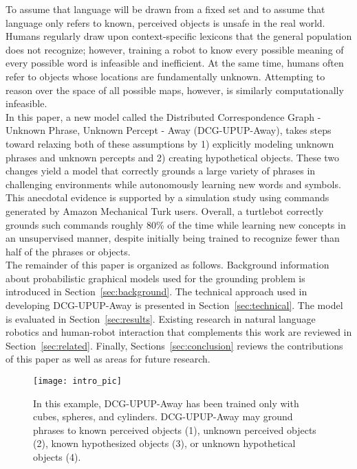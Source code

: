 To assume that language will be drawn from a fixed set and to assume that language only refers to known, perceived objects is unsafe in the real world.
Humans regularly draw upon context-specific lexicons that the general population does not recognize; however, training a robot to know every possible meaning of every possible word is infeasible and inefficient.
At the same time, humans often refer to objects whose locations are fundamentally unknown.
Attempting to reason over the space of all possible maps, however, is similarly computationally infeasible.\\
\indent In this paper, a new model called the Distributed Correspondence Graph - Unknown Phrase, Unknown Percept - Away (DCG-UPUP-Away), takes steps toward relaxing both of these assumptions by 1) explicitly modeling unknown phrases and unknown percepts and 2) creating hypothetical objects.
These two changes yield a model that correctly grounds a large variety of phrases in challenging environments while autonomously learning new words and symbols.
This anecdotal evidence is supported by a simulation study using commands generated by Amazon Mechanical Turk users.
Overall, a turtlebot correctly grounds such commands roughly 80\% of the time while learning new concepts in an unsupervised manner, despite initially being trained to recognize fewer than half of the phrases or objects.\\
\indent The remainder of this paper is organized as follows.
Background information about probabilistic graphical models used for the grounding problem is introduced in Section~\ref{sec:background}.
The technical approach used in developing DCG-UPUP-Away is presented in Section~\ref{sec:technical}.
The model is evaluated in Section~\ref{sec:results}.
Existing research in natural language robotics and human-robot interaction that complements this work are reviewed in Section~\ref{sec:related}.
Finally, Sections~\ref{sec:conclusion} reviews the contributions of this paper as well as areas for future research.
\begin{figure}[t]
	\centering
	\texttt{[image: intro\_pic]}
	\caption{In this example, DCG-UPUP-Away has been trained only with cubes, spheres, and cylinders. DCG-UPUP-Away may ground phrases to known perceived objects (1), unknown perceived objects (2), known hypothesized objects (3), or unknown hypothetical objects (4).}
	\label{fig:intro_pic}
\end{figure}